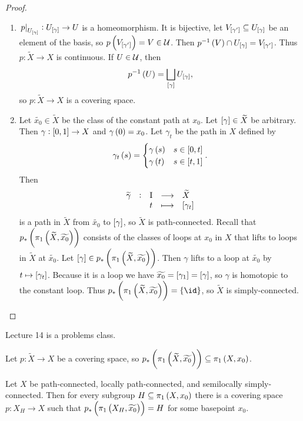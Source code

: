 \begin{proof}
\begin{enumerate}
\begin{itemize}
\end{itemize}
\item $ \eval{p}_{U_{\sbr{\gamma}}} : U_{\sbr{\gamma}} \to U $ is a homeomorphism. It is bijective, let $ V_{\sbr{\gamma'}} \subseteq U_{\sbr{\gamma}} $ be an element of the basis, so $ p\br{V_{\sbr{\gamma'}}} = V \in \UUU $. Then $ p^{-1}\br{V} \cap U_{\sbr{\gamma}} = V_{\sbr{\gamma'}} $. Thus $ p : \widetilde{X} \to X $ is continuous. If $ U \in \mathcal{U} $, then
$$ p^{-1}\br{U} = \bigsqcup_{\sbr{\gamma}} U_{\sbr{\gamma}}, $$
so $ p : \widetilde{X} \to X $ is a covering space.
\item Let $ \widetilde{x_0} \in \widetilde{X} $ be the class of the constant path at $ x_0 $. Let $ \sbr{\gamma} \in \widetilde{X} $ be arbitrary. Then $ \gamma : \sbr{0, 1} \to X $ and $ \gamma\br{0} = x_0 $. Let $ \gamma_t $ be the path in $ X $ defined by
$$ \gamma_t\br{s} =
\begin{cases}
\gamma\br{s} & s \in \sbr{0, t} \\
\gamma\br{t} & s \in \sbr{t, 1}
\end{cases}.
$$
Then
$$ \function[\widetilde{\gamma}]{\I}{\widetilde{X}}{t}{\sbr{\gamma_t}} $$
is a path in $ \widetilde{X} $ from $ \widetilde{x_0} $ to $ \sbr{\gamma} $, so $ \widetilde{X} $ is path-connected. Recall that $ p_*\br{\pi_1\br{\widetilde{X}, \widetilde{x_0}}} $ consists of the classes of loops at $ x_0 $ in $ X $ that lifts to loops in $ \widetilde{X} $ at $ \widetilde{x_0} $. Let $ \sbr{\gamma} \in p_*\br{\pi_1\br{\widetilde{X}, \widetilde{x_0}}} $. Then $ \gamma $ lifts to a loop at $ \widetilde{x_0} $ by $ t \mapsto \sbr{\gamma_t} $. Because it is a loop we have $ \widetilde{x_0} = \sbr{\gamma_1} = \sbr{\gamma} $, so $ \gamma $ is homotopic to the constant loop. Thus $ p_*\br{\pi_1\br{\widetilde{X}, \widetilde{x_0}}} = \cbr{\id} $, so $ \widetilde{X} $ is simply-connected.
\end{enumerate}
\end{proof}


Lecture 14 is a problems class.

\pagebreak


Let $ p : \widetilde{X} \to X $ be a covering space, so $ p_*\br{\pi_1\br{\widetilde{X}, \widetilde{x_0}}} \subseteq \pi_1\br{X, x_0} $.

\begin{proposition}
\label{prop:1.36}
Let $ X $ be path-connected, locally path-connected, and semilocally simply-connected. Then for every subgroup $ H \subseteq \pi_1\br{X, x_0} $ there is a covering space $ p : X_H \to X $ such that $ p_*\br{\pi_1\br{X_H, \widetilde{x_0}}} = H $ for some basepoint $ x_0 $.
\end{proposition}

